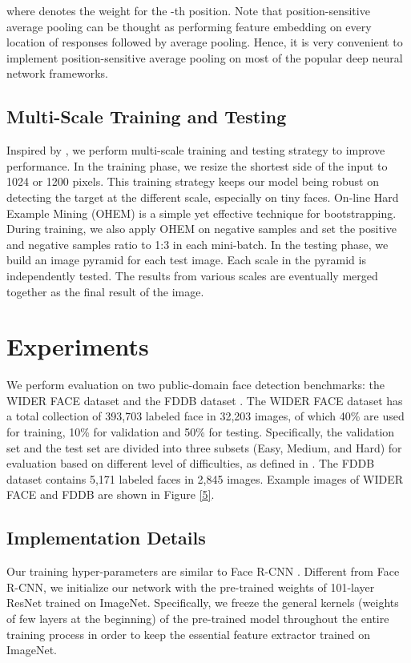 \documentclass{article} \usepackage{nips13submit_e,times}
\begin{document}
where  denotes the weight for the -th position.
Note that position-sensitive average pooling can be thought as performing feature embedding on every location of responses followed by average pooling. Hence, it is very convenient to implement position-sensitive average pooling on most of the popular deep neural network frameworks.




\subsection{Multi-Scale Training and Testing}	

Inspired by \cite{facercnn}, we perform multi-scale training and testing strategy to improve performance. In the training phase, we resize the shortest side of the input to 1024 or 1200 pixels. This training strategy keeps our model being robust on detecting the target at the different scale, especially on tiny faces. 
On-line Hard Example Mining (OHEM) \cite{OHEM} is a simple yet effective technique for bootstrapping. During training, we also apply OHEM on negative samples and set the positive and negative samples ratio to 1:3 in each mini-batch.
In the testing phase, we build an image pyramid for each test image. Each scale in the pyramid is independently tested. The results from various scales are eventually merged together as the final result of the image. 



\section{Experiments}



We perform evaluation on two public-domain face detection benchmarks: the WIDER FACE dataset \cite{wider} and the FDDB dataset \cite{fddb}. 
The WIDER FACE dataset has a total collection of 393,703 labeled face in 32,203 images, of which 40\% are used for training, 10\% for validation and 50\% for testing. Specifically, the validation set and the test set are divided into three subsets (Easy, Medium, and Hard) for evaluation based on different level of difficulties, as defined in \cite{wider}. 
The FDDB dataset contains 5,171 labeled faces in 2,845 images. 
Example images of WIDER FACE and FDDB are shown in Figure \ref{5}.




\subsection{Implementation Details}
Our training hyper-parameters are similar to Face R-CNN \cite{facercnn}. Different from Face R-CNN, we initialize our network with the pre-trained weights of 101-layer ResNet trained on ImageNet. Specifically, we freeze the general kernels (weights of few layers at the beginning) of the pre-trained model throughout the entire training process in order to keep the essential feature extractor trained on ImageNet. 
\end{document}
